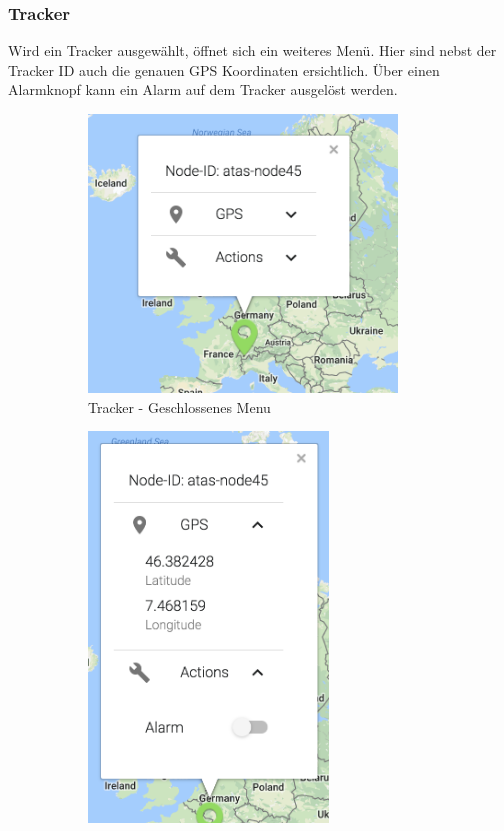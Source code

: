 \documentclass[11pt,english,german]{report}
\theoremstyle{definition}
\begin{document}
\subsubsection{Tracker}
Wird ein Tracker ausgewählt, öffnet sich ein weiteres Menü.  Hier sind nebst der Tracker ID auch die genauen GPS Koordinaten ersichtlich. Über einen Alarmknopf kann ein Alarm auf dem Tracker ausgelöst werden.
\begin{figure}[H]
	\centering
	\begin{subfigure}{.45\textwidth}
		\centering
		\includegraphics[width=0.9\textwidth]{img/atasweb/atas-web-node-closed.png}
		\caption[Tracker - Geschlossenes Menu]
		{Tracker - Geschlossenes Menu}
	\end{subfigure}%
	\begin{subfigure}{.45\textwidth}
		\centering
		\includegraphics[width=0.7\textwidth]{img/atasweb/atas-web-node-open.png}

\end{subfigure}
\end{figure}
\end{document}
